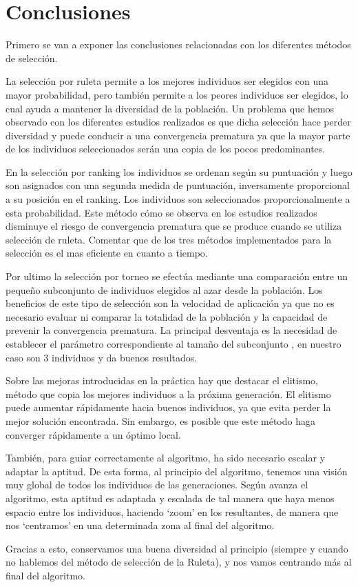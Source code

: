 \documentclass[12pt]{article}
\begin{document}
\section{Conclusiones}

Primero se van a exponer las conclusiones relacionadas con los diferentes métodos de selección.

La selección por ruleta permite a los mejores individuos ser elegidos con una mayor probabilidad, pero también permite a los peores individuos ser elegidos, lo cual ayuda a mantener la diversidad de la población.
Un problema que hemos observado con los diferentes estudios realizados es que dicha selección hace perder diversidad y puede conducir a una convergencia prematura ya que la mayor parte de los individuos seleccionados serán una copia de los pocos predominantes.

En la selección por ranking los individuos se ordenan según su puntuación y luego son asignados con una segunda medida de puntuación, inversamente proporcional a su posición en el ranking. Los individuos son seleccionados proporcionalmente a esta probabilidad. Este método cómo se observa en los estudios realizados disminuye el riesgo de convergencia prematura que se produce cuando se utiliza selección de ruleta. Comentar que de los tres métodos implementados para la selección es el mas eficiente en cuanto a tiempo.

Por ultimo la selección por torneo se efectúa mediante una comparación entre un pequeño subconjunto de individuos elegidos al azar desde la población.
Los beneficios de este tipo de selección son la velocidad de aplicación ya que no es necesario evaluar ni comparar la totalidad de la población y la capacidad de prevenir la convergencia prematura. La principal desventaja es la necesidad de establecer el parámetro correspondiente al tamaño del subconjunto , en nuestro caso son 3 individuos y da buenos resultados.

Sobre las mejoras introducidas en la práctica hay que destacar el elitismo, método que copia los mejores individuos a la
próxima generación. El elitismo puede aumentar rápidamente hacia buenos individuos, ya que evita perder la mejor solución encontrada. Sin embargo,
es posible que este método haga converger rápidamente a un óptimo local.

También, para guiar correctamente al algoritmo, ha sido necesario escalar y adaptar la aptitud. De esta forma,
al principio del algoritmo, tenemos una visión muy global de todos los individuos de las generaciones. Según
avanza el algoritmo, esta aptitud es adaptada y escalada de tal manera que haya menos espacio entre los individuos,
haciendo `zoom' en los resultantes, de manera que nos `centramos' en una determinada zona al final del algoritmo.

Gracias a esto, conservamos una buena diversidad al principio (siempre y cuando no hablemos del método de selección de la Ruleta), y nos vamos centrando más al final del algoritmo.
\end{document}
